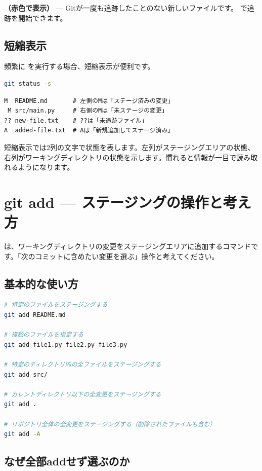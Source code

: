 \textbf{（赤色で表示）} — Gitが一度も追跡したことのない新しいファイルです。 で追跡を開始できます。

\subsection{短縮表示}

頻繁に  を実行する場合、短縮表示が便利です。

\begin{lstlisting}[language=bash]
git status -s
\end{lstlisting}

\begin{lstlisting}[language={}]
M  README.md       # 左側のMは「ステージ済みの変更」
 M src/main.py     # 右側のMは「未ステージの変更」
?? new-file.txt    # ??は「未追跡ファイル」
A  added-file.txt  # Aは「新規追加してステージ済み」
\end{lstlisting}

短縮表示では2列の文字で状態を表します。左列がステージングエリアの状態、右列がワーキングディレクトリの状態を示します。慣れると情報が一目で読み取れるようになります。

\section{git add — ステージングの操作と考え方}

 は、ワーキングディレクトリの変更をステージングエリアに追加するコマンドです。「次のコミットに含めたい変更を選ぶ」操作と考えてください。

\subsection{基本的な使い方}

\begin{lstlisting}[language=bash]
# 特定のファイルをステージングする
git add README.md

# 複数のファイルを指定する
git add file1.py file2.py file3.py

# 特定のディレクトリ内の全ファイルをステージングする
git add src/

# カレントディレクトリ以下の全変更をステージングする
git add .

# リポジトリ全体の全変更をステージングする（削除されたファイルも含む）
git add -A
\end{lstlisting}

\subsection{なぜ全部addせず選ぶのか}

